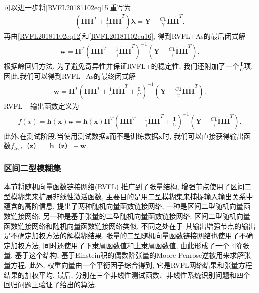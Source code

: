 {可以进一步将\eqref{RVFL20181102eq15}重写为
\begin{align}
  \left(\bm H \bm H^T  + \frac 1 \gamma \tilde{\bm H} \tilde{\bm H}^T \right )\bm \lambda  = \bm Y - \frac {C \bm 1} {\gamma}\tilde{\bm H} \tilde{\bm H}^T.  \label{RVFL20181102eq16}
\end{align}
再由\eqref{RVFL20181102eq12}和\eqref{RVFL20181102eq16}, 得到RVFL+As的最后闭式解
\begin{align}
\bm  w =\bm H^T \left(\bm H \bm H^T  + \frac 1 \gamma \tilde{\bm H} \tilde{\bm H}^T \right )^{-1} \left(\bm Y - \frac {C \bm 1} {\gamma}\tilde{\bm H} \tilde{\bm H}^T \right ). \label{RVFL20181102eq17}
\end{align}
根据岭回归方法\cite{Bishop2012-6469}, 为了避免奇异性并保证RVFL+的稳定性, 我们还附加了一个$\frac{\bm I}C$项. 因此,我们可以得到RVFL+As的最终闭式解
\begin{align}
\bm w = \bm H^T \left(\bm H \bm H^T  + \frac 1 \gamma \tilde{\bm H} \tilde{\bm H}^T +\frac{ \bm I} C \right)^{-1} \left(\bm Y -\frac {C \bm 1} {\gamma}\tilde{\bm H} \tilde{\bm H}^T \right ).
\label{RVFL20181102eq18}
\end{align}
RVFL+ 输出函数定义为
\begin{align}
  f(x) =\bm  h (\bm x)\bm w =\bm h(\bm  x)\bm H^ T \left(\bm H \bm H^T  +\frac 1 \gamma\tilde{\bm H} \tilde{\bm H}^T  +\frac{\bm  I} C \right)^{-1}\left(\bm Y - \frac {C \bm 1} {\gamma}\tilde{\bm H} \tilde{\bm H}^T \right).
\end{align}
此外,在测试阶段,当使用测试数据$\bm z$而不是训练数据$\bm x$时, 我们可以直接获得输出函数$f_{test}（\bm z）=\bm h（\bm z）-\bm w$.
\subsubsection{区间二型模糊集}
本节将随机向量函数链接网络(RVFL) 推广到了张量结构,  增强节点使用了区间二型模糊集来扩展非线性激活函数, 主要目的是用二型模糊集来捕捉输入输出关系中蕴含的高阶信息.
提出了两种随机向量函数链接网络, 一种是区间二型随机向量函数链接网络, 另一种是基于张量的二型随机向量函数链接网络.
区间二型随机向量函数链接网络和随机向量函数链接网络类似, 不同之处在于 其输出增强节点的输出是不确定加权方法的解模糊结果.
张量的二型随机向量函数链接网络也使用了不确定加权方法, 同时还使用了下隶属函数值和上隶属函数值, 由此形成了一个 4阶张量.
基于这个结构, 基于Einstein积的偶数阶张量的Moore-Penrose逆被用来求解张量方程.
此外, 权重向量由一个平衡因子综合得到, 它是RVFL网络结果和张量方程结果的加权平均.
最后, 分别在三个非线性测试函数、非线性系统识别问题和四个回归问题上验证了给出的算法.


}
